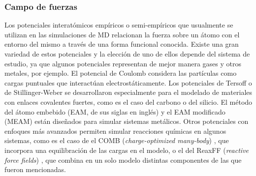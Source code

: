 \subsubsection{Campo de fuerzas}

Los potenciales interatómicos empíricos o semi-empíricos que usualmente se 
utilizan en las simulaciones de MD relacionan la fuerza sobre un átomo con el 
entorno del mismo a través de una forma funcional conocida. Existe una gran 
variedad de estos potenciales y la elección de uno de ellos depende del sistema 
de estudio, ya que algunos potenciales representan de mejor manera gases y otros 
metales, por ejemplo. El potencial de Coulomb \cite{coulomb} considera las 
partículas como cargas puntuales que interactúan electrostáticamente. Los 
potenciales de Tersoff \cite{tersoff} o de Stillinger-Weber 
\cite{stillinger-weber} se desarrollaron especialmente para el modelado de 
materiales con enlaces covalentes fuertes, como es el caso del carbono o del 
silicio. El método del átomo embebido (EAM, de sus siglas en inglés) \cite{eam} 
y el EAM modificado (MEAM) \cite{meam} están diseñados para simular sistemas 
metálicos. Otros potenciales con enfoques más avanzados permiten simular
reacciones químicas en algunos sistemas, como es el caso de el COMB 
(\textit{charge-optimized many-body}) \cite{comb}, que incorpora una 
equilibración de las cargas en el modelo, o el del ReaxFF (\textit{reactive 
force fields}) \cite{reaxff}, que combina en un solo modelo distintas 
componentes de las que fueron mencionadas. 

